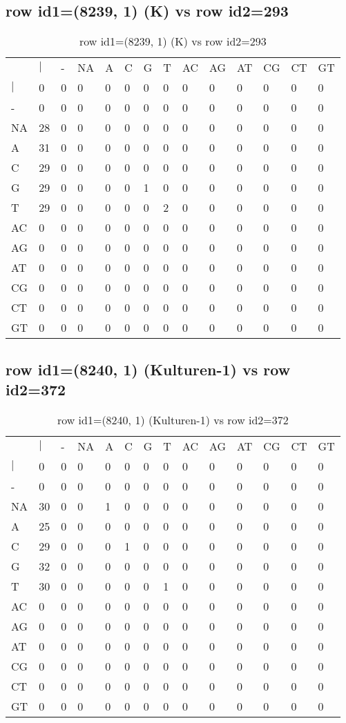 \subsection{row id1=(8239, 1) (K) vs row id2=293}
\begin{center}
\begin{longtable}{|l|l|l|l|l|l|l|l|l|l|l|l|l|l|}
\caption{row id1=(8239, 1) (K) vs row id2=293} \label{table_dm174}\\
\hline
\\
\hline
&$|$&-&NA&A&C&G&T&AC&AG&AT&CG&CT&GT\\
$|$&0&0&0&0&0&0&0&0&0&0&0&0&0\\
-&0&0&0&0&0&0&0&0&0&0&0&0&0\\
NA&28&0&0&0&0&0&0&0&0&0&0&0&0\\
A&31&0&0&0&0&0&0&0&0&0&0&0&0\\
C&29&0&0&0&0&0&0&0&0&0&0&0&0\\
G&29&0&0&0&0&1&0&0&0&0&0&0&0\\
T&29&0&0&0&0&0&2&0&0&0&0&0&0\\
AC&0&0&0&0&0&0&0&0&0&0&0&0&0\\
AG&0&0&0&0&0&0&0&0&0&0&0&0&0\\
AT&0&0&0&0&0&0&0&0&0&0&0&0&0\\
CG&0&0&0&0&0&0&0&0&0&0&0&0&0\\
CT&0&0&0&0&0&0&0&0&0&0&0&0&0\\
GT&0&0&0&0&0&0&0&0&0&0&0&0&0\\
\hline
\end{longtable}
\end{center}

\subsection{row id1=(8240, 1) (Kulturen-1) vs row id2=372}
\begin{center}
\begin{longtable}{|l|l|l|l|l|l|l|l|l|l|l|l|l|l|}
\caption{row id1=(8240, 1) (Kulturen-1) vs row id2=372} \label{table_dm176}\\
\hline
\\
\hline
&$|$&-&NA&A&C&G&T&AC&AG&AT&CG&CT&GT\\
$|$&0&0&0&0&0&0&0&0&0&0&0&0&0\\
-&0&0&0&0&0&0&0&0&0&0&0&0&0\\
NA&30&0&0&1&0&0&0&0&0&0&0&0&0\\
A&25&0&0&0&0&0&0&0&0&0&0&0&0\\
C&29&0&0&0&1&0&0&0&0&0&0&0&0\\
G&32&0&0&0&0&0&0&0&0&0&0&0&0\\
T&30&0&0&0&0&0&1&0&0&0&0&0&0\\
AC&0&0&0&0&0&0&0&0&0&0&0&0&0\\
AG&0&0&0&0&0&0&0&0&0&0&0&0&0\\
AT&0&0&0&0&0&0&0&0&0&0&0&0&0\\
CG&0&0&0&0&0&0&0&0&0&0&0&0&0\\
CT&0&0&0&0&0&0&0&0&0&0&0&0&0\\
GT&0&0&0&0&0&0&0&0&0&0&0&0&0\\
\hline
\end{longtable}
\end{center}

